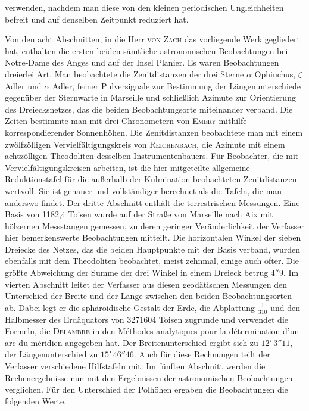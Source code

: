 verwenden, nachdem man diese von den kleinen periodischen Ungleichheiten befreit und auf denselben Zeitpunkt reduziert hat.

Von den acht Abschnitten, in die Herr \textsc{von Zach} das vorliegende Werk gegliedert hat, enthalten die ersten beiden sämtliche astronomischen Beobachtungen bei Notre-Dame des Anges und auf der Insel Planier. Es waren Beobachtungen dreierlei Art. Man beobachtete die Zenitdistanzen der drei Sterne $\alpha$ Ophiuchus, $\zeta$ Adler und $\alpha$ Adler, ferner Pulversignale zur Bestimmung der Längenunterschiede gegenüber der Sternwarte in Marseille und schließlich Azimute zur Orientierung des Dreiecksnetzes, das die beiden Beobachtungsorte miteinander verband. Die Zeiten bestimmte man mit drei Chronometern von \textsc{Emery} mithilfe korrespondierender Sonnenhöhen. Die Zenitdistanzen beobachtete man mit einem zwölfzölligen Vervielfältigungskreis von \textsc{Reichenbach}, die Azimute mit einem achtzölligen Theodoliten desselben Instrumentenbauers. Für Beobachter, die mit Vervielfältigungskreisen arbeiten, ist die hier mitgeteilte allgemeine Reduktionstafel für die außerhalb der Kulmination beobachteten Zenitdistanzen wertvoll. Sie ist genauer und vollständiger berechnet als die Tafeln, die man anderswo findet. Der dritte Abschnitt enthält die terrestrischen Messungen. Eine Basis von 1182,4 Toisen wurde auf der Straße von Marseille nach Aix mit hölzernen Messstangen gemessen, zu deren geringer Veränderlichkeit der Verfasser hier bemerkenswerte Beobachtungen mitteilt. Die horizontalen Winkel der sieben Dreiecke des Netzes, das die beiden Hauptpunkte mit der Basis verband, wurden ebenfalls mit dem Theodoliten beobachtet, meist zehnmal, einige auch öfter. Die größte Abweichung der Summe der drei Winkel in einem Dreieck betrug $4''9$. Im vierten Abschnitt leitet der Verfasser aus diesen geodätischen Messungen den Unterschied der Breite und der Länge zwischen den beiden Beobachtungsorten ab. Dabei legt er die sphäroidische Gestalt der Erde, die Abplattung $\frac{1}{310}$ und den Halbmesser des Erdäquators von 3271604 Toisen zugrunde und verwendet die Formeln, die \textsc{Delambre} in den Méthodes analytiques pour la détermination d'un arc du méridien angegeben hat. Der Breitenunterschied ergibt sich zu $12'\,3''11$, der Längenunterschied zu $15'\,46''46$. Auch für diese Rechnungen teilt der Verfasser verschiedene Hilfstafeln mit. Im fünften Abschnitt werden die Rechenergebnisse nun mit den Ergebnissen der astronomischen Beobachtungen verglichen. Für den Unterschied der Polhöhen ergaben die Beobachtungen die folgenden Werte.

